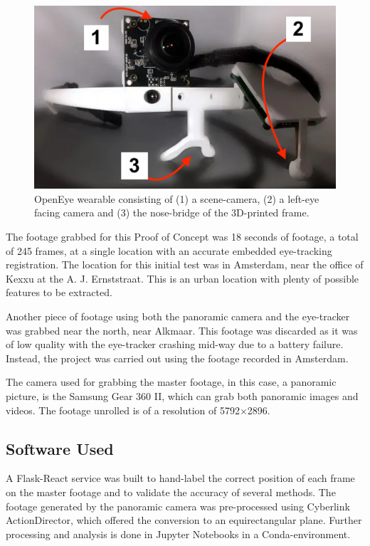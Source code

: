 \documentclass[sigconf, natbib=false, nonacm]{acmart}
\begin{document}
    \begin{figure}
        \includegraphics[width=\linewidth]{figures/3-exp-openeye.png}
        \caption{OpenEye wearable consisting of (1) a scene-camera, (2) a left-eye facing camera and (3) the nose-bridge of the 3D-printed frame. }
        \label{3-exp-openeye}
    \end{figure}

    The footage grabbed for this Proof of Concept was 18 seconds of footage, a total of 245 frames, at a single location with an accurate embedded eye-tracking registration. The location for this initial test was in Amsterdam, near the office of Kexxu at the A. J. Ernststraat. This is an urban location with plenty of possible features to be extracted. 
    
    Another piece of footage using both the panoramic camera and the eye-tracker was grabbed near the north, near Alkmaar. This footage was discarded as it was of low quality with the eye-tracker crashing mid-way due to a battery failure. Instead, the project was carried out using the footage recorded in Amsterdam.
    
    The camera used for grabbing the master footage, in this case, a panoramic picture, is the Samsung Gear 360 II, which can grab both panoramic images and videos\footnotemark.  The footage unrolled is of a resolution of 5792×2896. 
        
    \subsection{Software Used}
    A Flask-React service was built to hand-label the correct position of each frame on the master footage and to validate the accuracy of several methods\footnotemark. The footage generated by the panoramic camera was pre-processed using Cyberlink ActionDirector, which offered the conversion to an equirectangular plane. Further processing and analysis is done in Jupyter Notebooks in a Conda-environment. 
\end{document}
